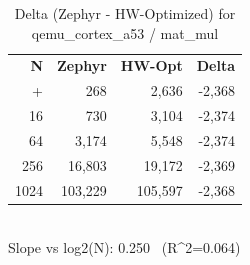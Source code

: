 \begin{table}[tb]
    \centering
    \caption{Delta (Zephyr - HW-Optimized) for qemu_cortex_a53 / mat_mul}
    \label{tab:delta_qemu_cortex_a53_mat_mul}
    \scriptsize
    \begin{tabular}{r r r r}
        \hline
        \textbf{N} & \textbf{Zephyr} & \textbf{HW-Opt} & \textbf{Delta} \\\n+        \hline
        4 & 268 & 2,636 & -2,368\\
        16 & 730 & 3,104 & -2,374\\
        64 & 3,174 & 5,548 & -2,374\\
        256 & 16,803 & 19,172 & -2,369\\
        1024 & 103,229 & 105,597 & -2,368\\
        \hline
    \end{tabular}
    \vspace{2mm}\\\n    Slope vs log2(N): 0.250 \ (R^2=0.064)\n\end{table}
